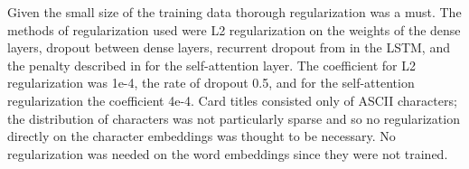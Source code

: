 \documentclass[letterpaper]{article} %
\begin{document}
Given the small size of the training data thorough regularization was a must.
The methods of regularization used were
L2 regularization on the weights of the dense layers,
dropout between dense layers,
recurrent dropout from \cite{Gal2016ATG} in the LSTM,
and the penalty described in \cite{Lin2017ASS} for the self-attention layer.
The coefficient for L2 regularization was 1e-4,
the rate of dropout 0.5,
and for the self-attention regularization the coefficient 4e-4.
Card titles consisted only of ASCII characters;
the distribution of characters was not particularly sparse
and so no regularization directly on the character embeddings
was thought to be necessary.
No regularization was needed on the word embeddings since they were not trained.




\end{document}

